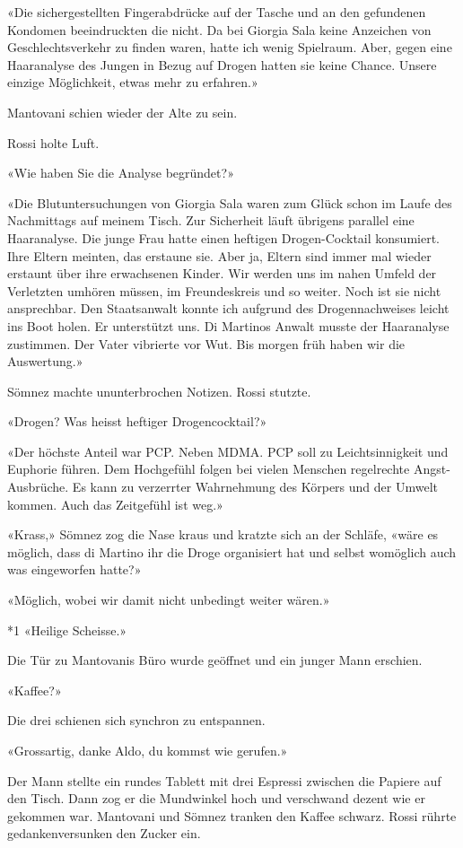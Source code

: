 «Die sichergestellten Fingerabdrücke auf der Tasche und an den
gefundenen Kondomen beeindruckten die nicht. Da bei Giorgia Sala keine
Anzeichen von Geschlechtsverkehr zu finden waren, hatte ich wenig
Spielraum. Aber, gegen eine Haaranalyse des Jungen in Bezug auf Drogen
hatten sie keine Chance. Unsere einzige Möglichkeit, etwas mehr zu
erfahren.»

Mantovani schien wieder der Alte zu sein.

Rossi holte Luft.

«Wie haben Sie die Analyse begründet?»

«Die Blutuntersuchungen von Giorgia Sala waren zum Glück schon im Laufe
des Nachmittags auf meinem Tisch. Zur Sicherheit läuft übrigens parallel
eine Haaranalyse. Die junge Frau hatte einen heftigen Drogen-Cocktail
konsumiert. Ihre Eltern meinten, das erstaune sie. Aber ja, Eltern sind
immer mal wieder erstaunt über ihre erwachsenen Kinder. Wir werden uns
im nahen Umfeld der Verletzten umhören müssen, im Freundeskreis und so
weiter. Noch ist sie nicht ansprechbar. Den Staatsanwalt konnte ich
aufgrund des Drogennachweises leicht ins Boot holen. Er unterstützt uns.
Di Martinos Anwalt musste der Haaranalyse zustimmen. Der Vater vibrierte
vor Wut. Bis morgen früh haben wir die Auswertung.»

Sömnez machte ununterbrochen Notizen. Rossi stutzte.

«Drogen? Was heisst heftiger Drogencocktail?»

«Der höchste Anteil war PCP. Neben MDMA. PCP soll zu Leichtsinnigkeit
und Euphorie führen. Dem Hochgefühl folgen bei vielen Menschen
regelrechte Angst-Ausbrüche. Es kann zu verzerrter Wahrnehmung des
Körpers und der Umwelt kommen. Auch das Zeitgefühl ist weg.»

«Krass,» Sömnez zog die Nase kraus und kratzte sich an der Schläfe,
«wäre es möglich, dass di Martino ihr die Droge organisiert hat und
selbst womöglich auch was eingeworfen hatte?»

«Möglich, wobei wir damit nicht unbedingt weiter wären.»

*1 «Heilige Scheisse.»

Die Tür zu Mantovanis Büro wurde geöffnet und ein junger Mann erschien.

«Kaffee?»

Die drei schienen sich synchron zu entspannen.

«Grossartig, danke Aldo, du kommst wie gerufen.»

Der Mann stellte ein rundes Tablett mit drei Espressi zwischen die
Papiere auf den Tisch. Dann zog er die Mundwinkel hoch und verschwand
dezent wie er gekommen war. Mantovani und Sömnez tranken den Kaffee
schwarz. Rossi rührte gedankenversunken den Zucker ein.

